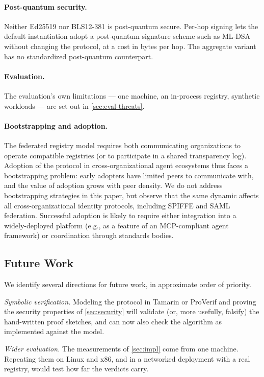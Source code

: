 \documentclass[11pt,a4paper]{article}
\begin{document}
\paragraph{Post-quantum security.}
Neither Ed25519 nor BLS12-381 is post-quantum secure. Per-hop signing
lets the default instantiation adopt a post-quantum signature scheme
such as ML-DSA \citep{fips204} without changing the protocol, at a cost
in bytes per hop. The aggregate variant has no standardized post-quantum
counterpart.

\paragraph{Evaluation.}
The evaluation's own limitations --- one machine, an in-process
registry, synthetic workloads --- are set out in
\cref{sec:eval-threats}.

\paragraph{Bootstrapping and adoption.}
The federated registry model requires both communicating organizations
to operate compatible registries (or to participate in a shared
transparency log). Adoption of the protocol in cross-organizational
agent ecosystems thus faces a bootstrapping problem: early adopters
have limited peers to communicate with, and the value of adoption
grows with peer density. We do not address bootstrapping strategies
in this paper, but observe that the same dynamic affects all
cross-organizational identity protocols, including SPIFFE and
SAML federation. Successful adoption is likely to require either
integration into a widely-deployed platform (e.g., as a feature of
an MCP-compliant agent framework) or coordination through standards
bodies.

\subsection{Future Work}
\label{sec:future-work}

We identify several directions for future work, in approximate order
of priority.

\emph{Symbolic verification.} Modeling the protocol in Tamarin or
ProVerif and proving the security properties of \cref{sec:security}
will validate (or, more usefully, falsify) the hand-written proof
sketches, and can now also check the algorithm as implemented against
the model.

\emph{Wider evaluation.} The measurements of \cref{sec:impl} come from
one machine. Repeating them on Linux and x86, and in a networked
deployment with a real registry, would test how far the verdicts carry.
\end{document}
